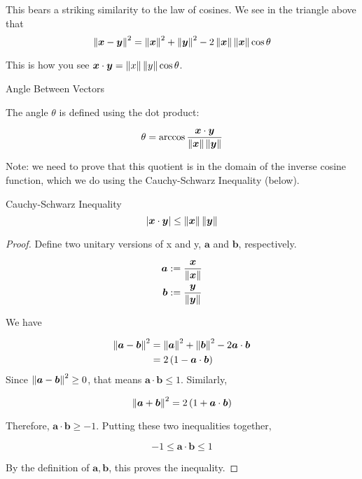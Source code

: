 \documentclass[11pt]{article}
\begin{document}
This bears a striking similarity to the law of cosines.
We see in the triangle above that
$$
\left\lVert\bm{x} - \bm{y}\right\rVert^2 = \left\lVert\bm{x}\right\rVert^2 + \left\lVert\bm{y}\right\rVert^2 - 2 \left\lVert\bm{x}\right\rVert \left\lVert\bm{x}\right\rVert \cos \theta
$$


This is how you see $\bm{x} \cdot \bm{y} = \left\lVert x\right\rVert \left\lVert y\right\rVert \cos \theta$.

\begin{definition}{Angle Between Vectors}
  
  The angle $\theta$ is defined using the dot product:

  $$
  \theta = \arccos \frac{\bm{x} \cdot \bm{y}}{\left\lVert\bm{x}\right\rVert \left\lVert\bm{y}\right\rVert}
  $$
  
  Note: we need to prove that this quotient is in the domain of the inverse cosine function, which we do using the Cauchy-Schwarz Inequality (below).
\end{definition}

\begin{theorem}{Cauchy-Schwarz Inequality}
  $$\left\lvert \bm{x} \cdot \bm{y} \right\rvert \leq \left\lVert\bm{x}\right\rVert \left\lVert\bm{y}\right\rVert$$

  \begin{proof}
    
    Define two unitary versions of x and y, $\bm{a}$ and $\bm{b}$, respectively.
    
    \begin{align*}
      \bm{a} & := \frac{\bm{x}}{\left\lVert\bm{x}\right\rVert} \\
      \bm{b} & := \frac{\bm{y}}{\left\lVert\bm{y}\right\rVert} \\
    \end{align*}

    We have

    \begin{align*}
      \left\lVert\bm{a} - \bm{b}\right\rVert^2 &= \left\lVert\bm{a}\right\rVert^2 + \left\lVert\bm{b}\right\rVert^2 - 2 \bm{a} \cdot \bm{b} \\
      &= 2 \left ( 1 - \bm{a} \cdot \bm{b} \right) \\
    \end{align*}
    Since $\left\lVert\bm{a} - \bm{b}\right\rVert^2 \geq 0$, that means $\bm{a} \cdot \bm{b} \leq 1$.
    Similarly,
    
    $$
    \left\lVert\bm{a} + \bm{b}\right\rVert^2 = 2 \left ( 1 + \bm{a} \cdot \bm{b} \right)
    $$

    Therefore, $\bm{a} \cdot \bm{b} \geq -1$.
    Putting these two inequalities together,
    
    $$
    -1 \leq \bm{a} \cdot \bm{b} \leq 1
    $$

    By the definition of $\bm{a}, \bm{b}$, this proves the inequality.
  \end{proof}
\end{theorem}
\end{document}
